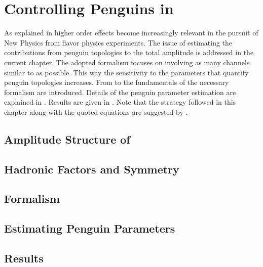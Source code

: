 
\chapter{Controlling Penguins in \phis}
\label{Penguins}

As explained in  higher order effects become increasingly relevant in the pursuit
of New Physics from flavor physics experiments. The issue of estimating the contributions from
penguin topologies to the total \BsJpsiPhi amplitude is addressed in the current chapter.
The adopted formalism focuses on involving as many channels similar to \BsJpsiPhi as possible.
This way the sensitivity to the parameters that quantify penguin topologies increases.
From  to  the fundamentals of
the necessary formalism are introduced. Details of the penguin parameter estimation are
explained in . Results are given in .
Note that the strategy followed in this chapter along with the quoted equations are
suggested by \cite{Fleischer:1999zi,Faller:2008gt,DeBruyn:2014oga}.

\section{Amplitude Structure of \BsJpsiPhi}
\label{jpsiphi_amp_struct}


\section{Hadronic Factors and \grpsuthree Symmetry}
\label{had_pars_suthree}


\section{Formalism}
\label{penguin_formalism}


\section{Estimating Penguin Parameters}
\label{penguin_more_chanells}


\section{Results}
\label{penguin_results}

